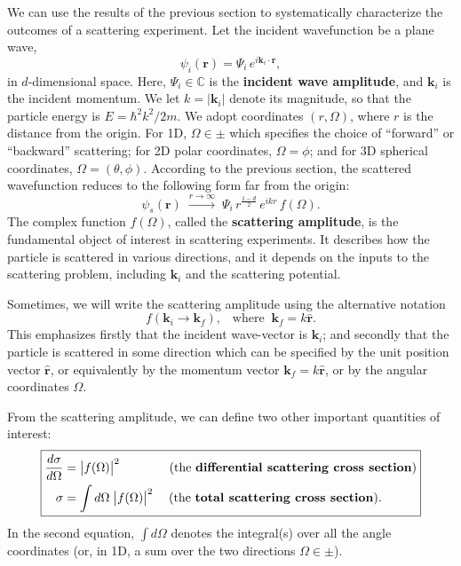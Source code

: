 \documentclass[pra,12pt]{revtex4}
\begin{document}
We can use the results of the previous section to systematically
characterize the outcomes of a scattering experiment.  Let the
incident wavefunction be a plane wave,
\begin{equation}
  \psi_i(\mathbf{r}) = \Psi_i \, e^{i\mathbf{k}_i\cdot\mathbf{r}},
\end{equation}
in $d$-dimensional space.  Here, $\Psi_i \in \mathbb{C}$ is the
\textbf{incident wave amplitude}, and $\mathbf{k}_i$ is the incident
momentum.  We let $k = |\mathbf{k}_i|$ denote its magnitude, so that
the particle energy is $E = \hbar^2k^2/2m$.  We adopt coordinates
$(r,\Omega)$, where $r$ is the distance from the origin.  For 1D,
$\Omega \in \pm$ which specifies the choice of ``forward'' or
``backward'' scattering; for 2D polar coordinates, $\Omega = \phi$;
and for 3D spherical coordinates, $\Omega = (\theta,\phi)$.  According
to the previous section, the scattered wavefunction reduces to the
following form far from the origin:
\begin{equation}
  \psi_s(\mathbf{r})\;  \overset{r\rightarrow\infty}{\longrightarrow}\; \Psi_i \, r^{\frac{1-d}{2}} \, e^{ikr} \, f(\Omega).
\end{equation}
The complex function $f(\Omega)$, called the \textbf{scattering
  amplitude}, is the fundamental object of interest in scattering
experiments.  It describes how the particle is scattered in various
directions, and it depends on the inputs to the scattering problem,
including $\mathbf{k}_i$ and the scattering potential.

Sometimes, we will write the scattering amplitude using the
alternative notation
\begin{equation}
  f(\mathbf{k}_i \rightarrow \mathbf{k}_f), \;\;\;\mathrm{where}\;\; \mathbf{k}_f = k \hat{\mathbf{r}}.
\end{equation}
This emphasizes firstly that the incident wave-vector is
$\mathbf{k}_i$; and secondly that the particle is scattered in some
direction which can be specified by the unit position vector
$\hat{\mathbf{r}}$, or equivalently by the momentum vector
$\mathbf{k}_f = k \hat{\mathbf{r}}$, or by the angular coordinates
$\Omega$.

From the scattering amplitude, we can define two other important
quantities of interest:
$$\boxed{\begin{aligned}\frac{d\sigma}{d\Omega} &= \big|f(\Omega)\big|^2 \qquad\quad\quad \text{(the \textbf{differential scattering cross section})} \\ \sigma &= \int d\Omega\; \big|f(\Omega)\big|^2 \quad\; \text{(the \textbf{total scattering cross section}).}
  \end{aligned}}$$
In the second equation, $\int d\Omega$ denotes the integral(s) over
all the angle coordinates (or, in 1D, a sum over the two directions
$\Omega \in \pm$).
\end{document}
